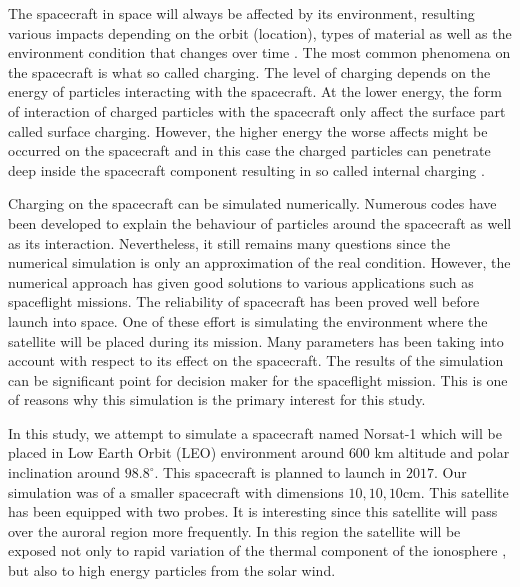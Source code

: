 

The spacecraft in space will always be affected by its environment, resulting various
impacts depending on the orbit (location), types of material as well as the environment
condition that changes over time \citep{trove.nla.gov.au/work/21680840}. The  most common phenomena on the spacecraft is what so
called charging. The level of charging depends on the energy of particles interacting with
the spacecraft. At the lower energy, the form of interaction of charged particles with the
spacecraft only affect the surface part called surface charging. However, the higher energy
the worse affects might be occurred on the spacecraft and in this case the charged particles
can penetrate deep inside the spacecraft component resulting in so called internal charging \citep{fennell2001spacecraft}.

Charging on the spacecraft can be simulated numerically. Numerous codes have been developed
to explain the behaviour of particles around the spacecraft as well as its interaction.
Nevertheless, it still remains many questions since the numerical simulation is only an approximation
of the real condition. However, the numerical approach has given good solutions to various applications
such as spaceflight missions. The reliability of spacecraft has been proved well before launch into space.
One of these effort is simulating the environment where the satellite will be placed during its mission.
Many parameters has been taking into account with respect to its effect on the spacecraft.
The results of the simulation can be significant point for decision maker for the spaceflight
mission. This is one of reasons why this simulation is the primary interest for this study.

In this study, we attempt to simulate a spacecraft named Norsat-1 which will be placed in
Low Earth Orbit (LEO) environment around \(600\) km altitude and polar inclination around \(98.8^\circ\).
This spacecraft is planned to launch in \(2017\)\citep{norSat}. Our simulation was of a smaller spacecraft with dimensions
\(10,10,10\)cm.
This satellite
has been equipped with two probes. It is interesting since this satellite will pass over
the auroral region more frequently. In this region  the satellite will be exposed not only to
rapid variation of the thermal component of the ionosphere \citep{hastings1995review}, but also to high
energy particles from the solar wind.

